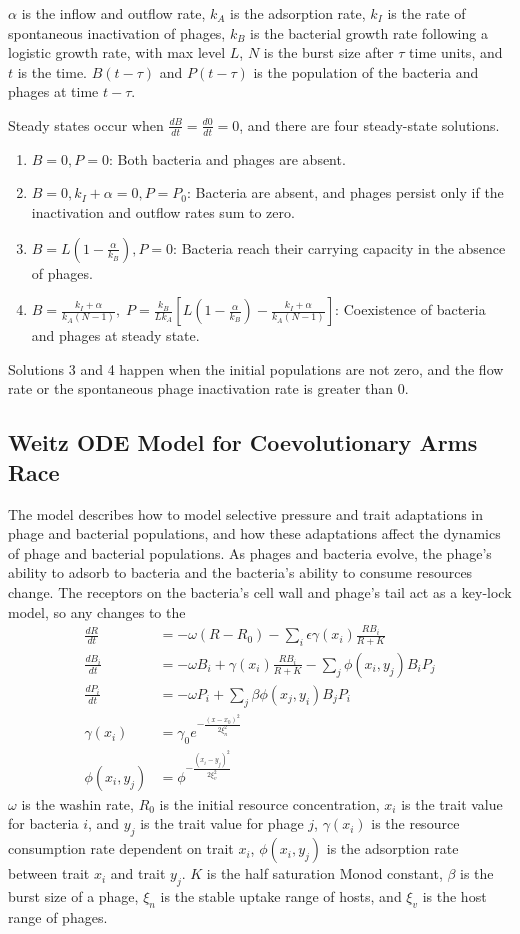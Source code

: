 $\alpha$ is the inflow and outflow rate, $k_A$ is the adsorption rate, $k_I$ is the rate of spontaneous inactivation of phages, $k_B$ is the bacterial growth rate following a logistic growth rate, with max level $L$, $N$ is the burst size after $\tau$ time units, and $t$ is the time. 
$B(t-\tau)$ and $P(t-\tau)$ is the population of the bacteria and phages at time $t-\tau$. 

Steady states occur when $\frac{dB}{dt} = \frac{d0}{dt} = 0$, and there are four steady-state solutions. 
\begin{enumerate}
    \item $B=0, P=0$: Both bacteria and phages are absent.
    \item $B=0, k_I + \alpha = 0, P = P_0$: Bacteria are absent, and phages persist only if the inactivation and outflow rates sum to zero.
    \item $B = L\left (1-\frac{\alpha}{k_B} \right ), P=0$: Bacteria reach their carrying capacity in the absence of phages.
    \item $B=\frac{k_I + \alpha}{k_A (N-1)},\; P=\frac{k_B}{Lk_A}\left [L\left ( 1- \frac{\alpha}{k_B} \right ) - \frac{k_I + \alpha}{k_A(N-1)}  \right ]$: Coexistence of bacteria and phages at steady state.
\end{enumerate}
Solutions 3 and 4 happen when the initial populations are not zero, and the flow rate or the spontaneous phage inactivation rate is greater than 0. 

\subsection{Weitz ODE Model for Coevolutionary Arms Race}
The \citet{weitzCoevolutionaryArmsRaces2005} model describes how to model selective pressure and trait adaptations in phage and bacterial populations, and how these adaptations affect the dynamics of phage and bacterial populations. 
As phages and bacteria evolve, the phage's ability to adsorb to bacteria and the bacteria's ability to consume resources change. 
The receptors on the bacteria's cell wall and phage's tail act as a key-lock model, so any changes to the 
\begin{align}
    \frac{dR}{dt} &= -\omega(R-R_0) - \sum_i \epsilon\gamma(x_i)\frac{RB_i}{R+K} \\
    \frac{dB_i}{dt} &= -\omega B_i+ \gamma(x_i)\frac{RB_i}{R+K} - \sum_j \phi(x_i, y_j)B_i P_j \\ 
    \frac{dP_i}{dt} &= -\omega P_i + \sum_j \beta \phi(x_j, y_i)B_j P_i\\
        \gamma(x_i) &= \gamma_0 e^{-\frac{(x-x_0)^2}{2\xi_n^2}}\\
        \phi(x_i, y_j) &= \phi^{-\frac{(x_i-y_j)^2}{2\xi_v^2}}
\end{align}
$\omega$ is the washin rate, $R_0$ is the initial resource concentration, $x_i$ is the trait value for bacteria $i$, and $y_j$ is the trait value for phage $j$, $\gamma(x_i)$ is the resource consumption rate dependent on trait $x_i$, $\phi(x_i, y_j)$ is the adsorption rate between trait $x_i$ and trait $y_j$. 
$K$ is the half saturation Monod constant, $\beta$ is the burst size of a phage, $\xi_n$ is the stable uptake range of hosts, and $\xi_v$ is the host range of phages. 

